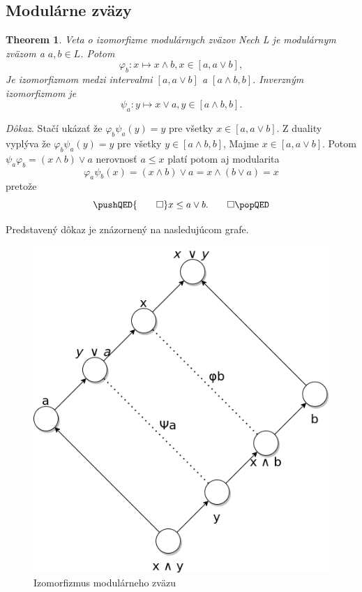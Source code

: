 \documentclass[a4paper,10pt,oneside]{report}%
\newtheorem{theorem}{Theorem}
\begin{document}
\subsection{Modulárne zväzy}
    \begin{theorem} \emph{Veta o izomorfizme modulárnych zväzov}
    Nech L je modulárnym zväzom a $a, b \in L$. Potom
        \begin{equation}
            \varphi_{b}: x \mapsto x \wedge b, x \in [a, a \vee b],
        \end{equation}
    Je izomorfizmom medzi intervalmi $[a, a \vee b]$ a $[ a \wedge b, b]$.
    Inverzným izomorfizmom je
        \begin{equation}
            \psi_{a}: y \mapsto x \vee a, y \in [a \wedge b, b].
        \end{equation}
    \end{theorem}
    \emph{Dôkaz}.  Stačí ukázať že $\varphi_{b}\psi_{a}(y) = y$ pre všetky $x \in [a, a \vee b]$.
    Z duality vyplýva že $\varphi_{b}\psi_{a}(y) = y$ pre všetky
        $y \in [a \wedge b, b]$,
    Majme $x \in [a, a \vee b]$. Potom
        $\psi_{a}\varphi_{b} = ( x \wedge b ) \vee a$ nerovnosť $a \leq x$ platí
        potom aj modularita
        \begin{equation}
            \varphi_{a}\psi_{b}(x) =
            ( x \wedge b ) \vee a =
            x \wedge ( b \vee a) =
            x
        \end{equation}
        pretože
        \[
            \pushQED{\qed}
            x \leq a \vee b. \qedhere
            \popQED
        \]

    Predstavený dôkaz je znázornený na nasledujúcom grafe.

\begin{figure}[!ht]
    \centering
    \includegraphics[scale=0.35]{modular_lattice_isomorphism.png}
    \caption{Izomorfizmus modulárneho zväzu}
\end{figure}
\end{document}
